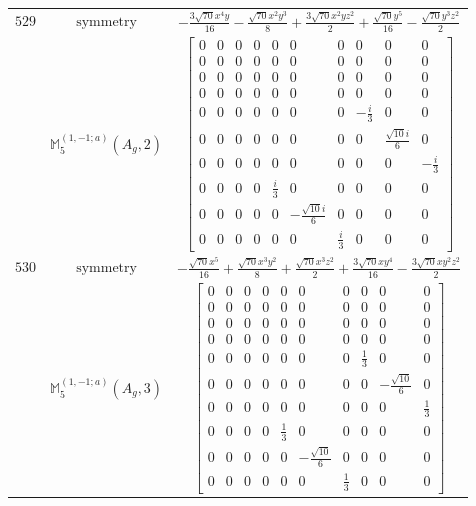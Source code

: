 \documentclass[fleqn,8pt,landscape]{jsarticle}
\begin{document}
\begin{longtable}{ccc}
$ 529 $ & $ \text{symmetry} $ & $ - \frac{3 \sqrt{70} x^{4} y}{16} - \frac{\sqrt{70} x^{2} y^{3}}{8} + \frac{3 \sqrt{70} x^{2} y z^{2}}{2} + \frac{\sqrt{70} y^{5}}{16} - \frac{\sqrt{70} y^{3} z^{2}}{2} $ \\
$  $ & $ \mathbb{M}_{5}^{(1,-1;a)}(A_{g},2) $ & $ \begin{bmatrix} 0 & 0 & 0 & 0 & 0 & 0 & 0 & 0 & 0 & 0 \\ 0 & 0 & 0 & 0 & 0 & 0 & 0 & 0 & 0 & 0 \\ 0 & 0 & 0 & 0 & 0 & 0 & 0 & 0 & 0 & 0 \\ 0 & 0 & 0 & 0 & 0 & 0 & 0 & 0 & 0 & 0 \\ 0 & 0 & 0 & 0 & 0 & 0 & 0 & - \frac{i}{3} & 0 & 0 \\ 0 & 0 & 0 & 0 & 0 & 0 & 0 & 0 & \frac{\sqrt{10} i}{6} & 0 \\ 0 & 0 & 0 & 0 & 0 & 0 & 0 & 0 & 0 & - \frac{i}{3} \\ 0 & 0 & 0 & 0 & \frac{i}{3} & 0 & 0 & 0 & 0 & 0 \\ 0 & 0 & 0 & 0 & 0 & - \frac{\sqrt{10} i}{6} & 0 & 0 & 0 & 0 \\ 0 & 0 & 0 & 0 & 0 & 0 & \frac{i}{3} & 0 & 0 & 0 \end{bmatrix} $ \\ \hline
$ 530 $ & $ \text{symmetry} $ & $ - \frac{\sqrt{70} x^{5}}{16} + \frac{\sqrt{70} x^{3} y^{2}}{8} + \frac{\sqrt{70} x^{3} z^{2}}{2} + \frac{3 \sqrt{70} x y^{4}}{16} - \frac{3 \sqrt{70} x y^{2} z^{2}}{2} $ \\
$  $ & $ \mathbb{M}_{5}^{(1,-1;a)}(A_{g},3) $ & $ \begin{bmatrix} 0 & 0 & 0 & 0 & 0 & 0 & 0 & 0 & 0 & 0 \\ 0 & 0 & 0 & 0 & 0 & 0 & 0 & 0 & 0 & 0 \\ 0 & 0 & 0 & 0 & 0 & 0 & 0 & 0 & 0 & 0 \\ 0 & 0 & 0 & 0 & 0 & 0 & 0 & 0 & 0 & 0 \\ 0 & 0 & 0 & 0 & 0 & 0 & 0 & \frac{1}{3} & 0 & 0 \\ 0 & 0 & 0 & 0 & 0 & 0 & 0 & 0 & - \frac{\sqrt{10}}{6} & 0 \\ 0 & 0 & 0 & 0 & 0 & 0 & 0 & 0 & 0 & \frac{1}{3} \\ 0 & 0 & 0 & 0 & \frac{1}{3} & 0 & 0 & 0 & 0 & 0 \\ 0 & 0 & 0 & 0 & 0 & - \frac{\sqrt{10}}{6} & 0 & 0 & 0 & 0 \\ 0 & 0 & 0 & 0 & 0 & 0 & \frac{1}{3} & 0 & 0 & 0 \end{bmatrix} $ \\ \hline

\end{longtable}
\end{document}

